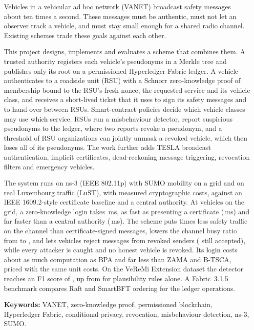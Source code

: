 Vehicles in a vehicular ad hoc network (VANET) broadcast safety messages about ten times a second.
These messages must be authentic, must not let an observer track a vehicle, and must stay small
enough for a shared radio channel. Existing schemes trade these goals against each other.

This project designs, implements and evaluates a scheme that combines them. A trusted authority
registers each vehicle's pseudonyms in a Merkle tree and publishes only its root on a permissioned
Hyperledger Fabric ledger. A vehicle authenticates to a roadside unit (RSU) with a Schnorr
zero-knowledge proof of membership bound to the RSU's fresh nonce, the requested service and its
vehicle class, and receives a short-lived ticket that it uses to sign its safety messages and to
hand over between RSUs. Smart-contract policies decide which vehicle classes may use which service.
RSUs run a misbehaviour detector, report suspicious pseudonyms to the ledger, where two reports
revoke a pseudonym, and a threshold of RSU organizations can jointly unmask a revoked vehicle, which
then loses all of its pseudonyms. The work further adds TESLA broadcast authentication, implicit
certificates, dead-reckoning message triggering, revocation filters and emergency vehicles.

The system runs on ns-3 (IEEE 802.11p) with SUMO mobility on a grid and on real Luxembourg traffic
(LuST), with measured cryptographic costs, against an IEEE 1609.2-style certificate baseline and a
central authority. At  vehicles on the grid, a zero-knowledge login takes
\,ms, as fast as presenting a certificate
(\,ms) and far faster than a central authority
(\,ms). The scheme puts  times less
safety traffic on the channel than certificate-signed messages, lowers the channel busy ratio from
 to , and lets vehicles reject messages
from revoked senders ( still accepted), while every
attacker is caught and no honest vehicle is revoked. Its login costs about as much computation as
BPA and far less than ZAMA and B-TSCA, priced with the same unit costs. On the
VeReMi Extension dataset the detector reaches an F1 score of , up from
 for plausibility rules alone. A Fabric~3.1.5 benchmark compares Raft and
SmartBFT ordering for the ledger operations.

\vspace{0.5em}
\noindent\textbf{Keywords:} VANET, zero-knowledge proof, permissioned blockchain, Hyperledger Fabric,
conditional privacy, revocation, misbehaviour detection, ns-3, SUMO.
